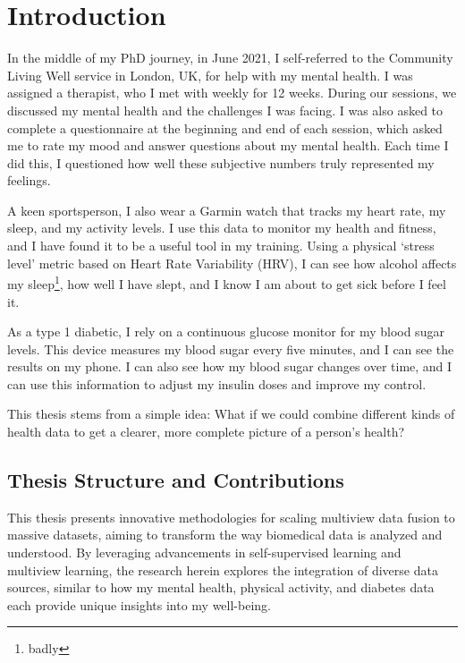 \graphicspath{{chapters/introduction/}}


\chapter{Introduction}\label{chap:introduction}

In the middle of my PhD journey, in June 2021, I self-referred to the Community Living Well service in London, UK, for help with my mental health. I was assigned a therapist, who I met with weekly for 12 weeks. During our sessions, we discussed my mental health and the challenges I was facing. I was also asked to complete a questionnaire at the beginning and end of each session, which asked me to rate my mood and answer questions about my mental health. Each time I did this, I questioned how well these subjective numbers truly represented my feelings.

A keen sportsperson, I also wear a Garmin watch that tracks my heart rate, my sleep, and my activity levels. I use this data to monitor my health and fitness, and I have found it to be a useful tool in my training. Using a physical `stress level' metric based on Heart Rate Variability (HRV), I can see how alcohol affects my sleep\footnote{badly}, how well I have slept, and I know I am about to get sick before I feel it.

As a type 1 diabetic, I rely on a continuous glucose monitor for my blood sugar levels. This device measures my blood sugar every five minutes, and I can see the results on my phone. I can also see how my blood sugar changes over time, and I can use this information to adjust my insulin doses and improve my control.

This thesis stems from a simple idea: What if we could combine different kinds of health data to get a clearer, more complete picture of a person's health?


\section{Thesis Structure and Contributions}

This thesis presents innovative methodologies for scaling multiview data fusion to massive datasets, aiming to transform the way biomedical data is analyzed and understood. By leveraging advancements in self-supervised learning and multiview learning, the research herein explores the integration of diverse data sources, similar to how my mental health, physical activity, and diabetes data each provide unique insights into my well-being.

